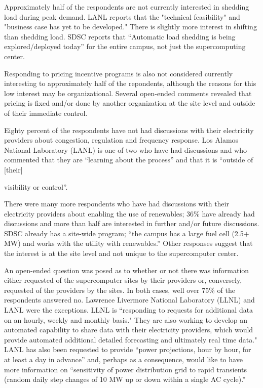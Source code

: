 Approximately half of the respondents are not currently interested in shedding
load during peak demand. LANL reports that the "technical feasibility" and "business case has yet to be developed."
There is slightly more interest in shifting than shedding load. SDSC reports that
 ``Automatic load shedding is being
explored/deployed today'' for the entire campus, not just the supercomputing center.

Responding to pricing incentive programs is also not considered currently interesting to approximately half of the repondents,
although the reasons for this low interest may be organizational. Several
open-ended comments revealed that pricing is fixed and/or done by another
organization at the site level and outside of their immediate control.

Eighty percent of the respondents have not had discussions with their
electricity providers about congestion, regulation and frequency
response. Los Alamos National Laboratory (LANL) is one of two who have had discussions and who commented that
they are ``learning about the process'' and that it is ``outside of [their]

visibility or control''.

There were many more respondents who have had discussions with their
electricity providers about enabling the use of renewables; 36{\%}
have already had discussions and more than half are interested in further
and/or future discussions. SDSC already has a site-wide program; ``the
campus has a large fuel cell (2.5$+$ MW) and works with the utility with
renewables.'' Other responses suggest that the interest is at the site level
and not unique to the supercomputer center.

An open-ended question was posed as to whether or not there was information
either requested of the supercomputer sites by their providers or,
conversely, requested of the providers by the sites. In both cases, well
over 75{\%} of the respondents answered no. Lawrence Livermore National Laboratory (LLNL) and LANL were the
exceptions. LLNL is ``responding to requests for additional data on an hourly, 
weekly and monthly basis."  They are also working to develop an automated capability to share 
data with their electricity providers, which would provide automated additional 
detailed forecasting and ultimately real time data."
LANL has also been requested to provide ``power projections, hour by hour,
for at least a day in advance'' and, perhaps as a consequence, would like to
have more information on ``sensitivity of power distribution grid to rapid
transients (random daily step changes of 10 MW up or down within a single AC
cycle).''

